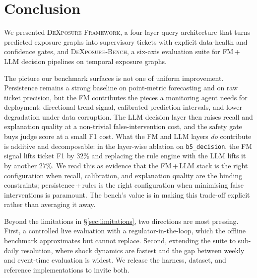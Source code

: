 \documentclass[10pt,journal,compsoc,onecolumn]{IEEEtran}
\begin{document}









\section{Conclusion}

We presented \textsc{DeXposure-Framework}, a four-layer query architecture that turns predicted exposure graphs into supervisory tickets with explicit data-health and confidence gates, and \textsc{DeXposure-Bench}, a six-axis evaluation suite for FM\,+\,LLM decision pipelines on temporal exposure graphs.

The picture our benchmark surfaces is not one of uniform improvement. Persistence remains a strong baseline on point-metric forecasting and on raw ticket precision, but the FM contributes the pieces a monitoring agent needs for deployment: directional trend signal, calibrated prediction intervals, and lower degradation under data corruption. The LLM decision layer then raises recall and explanation quality at a non-trivial false-intervention cost, and the safety gate buys judge score at a small F1 cost. What the FM and LLM layers \emph{do} contribute is additive and decomposable: in the layer-wise ablation on \texttt{b5\_decision}, the FM signal lifts ticket F1 by $32\%$ and replacing the rule engine with the LLM lifts it by another $27\%$. We read this as evidence that the FM\,+\,LLM stack is the right configuration when recall, calibration, and explanation quality are the binding constraints; persistence\,+\,rules is the right configuration when minimising false interventions is paramount. The bench's value is in making this trade-off explicit rather than averaging it away.

Beyond the limitations in \S\ref{sec:limitations}, two directions are most pressing. First, a controlled live evaluation with a regulator-in-the-loop, which the offline benchmark approximates but cannot replace. Second, extending the suite to sub-daily resolution, where shock dynamics are fastest and the gap between weekly and event-time evaluation is widest. We release the harness, dataset, and reference implementations to invite both.

\end{document}
